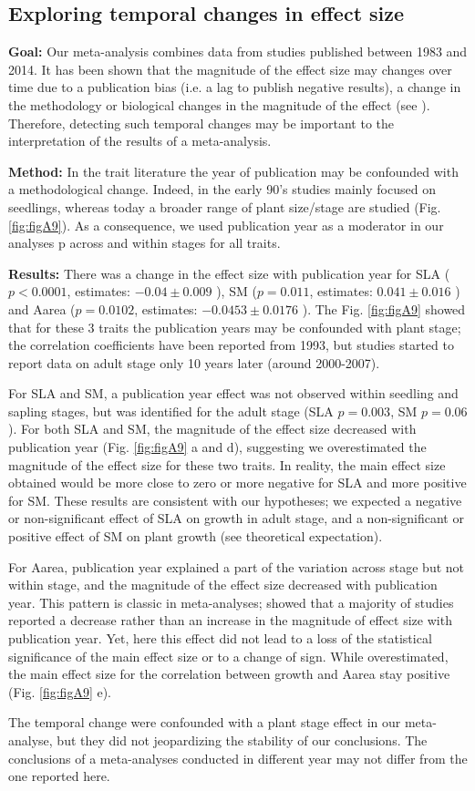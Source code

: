 \documentclass[a4paper,11pt]{article}
\begin{document}
\begin{appendices}
\subsection{Exploring temporal changes in effect size}
\textbf{Goal:} Our meta-analysis combines data from studies published between 1983 and 2014. It has been shown that the magnitude of the effect size may changes over time due to a publication bias (i.e. a lag to publish negative results), a change in the methodology or biological changes in the magnitude of the effect (see \citealt{Koricheva:2013hy}). Therefore, detecting such temporal changes may be important to the interpretation of the results of a meta-analysis.

\textbf{Method:} In the trait literature the year of publication may be confounded with a methodological change. Indeed, in the early 90’s studies mainly focused on seedlings, whereas today a broader range of plant size/stage are studied (Fig. \ref{fig:figA9}). As a consequence, we used publication year as a moderator in our analyses \citep{Zvereva:2008jm}p across and within stages for all traits.

\textbf{Results:} There was a change in the effect size with publication year for SLA ($p<0.0001$, estimates: $-0.04 \pm 0.009$ ), SM ($p = 0.011$, estimates: $0.041 \pm 0.016$ ) and Aarea ($p = 0.0102$, estimates: $-0.0453 \pm 0.0176$ ). The Fig. \ref{fig:figA9} showed that for these 3 traits the publication years may be confounded with plant stage; the correlation coefficients have been reported from 1993, but studies started to report data on adult stage only 10 years later (around 2000-2007).

For SLA and SM, a publication year effect was not observed within seedling and sapling stages, but was identified for the adult stage (SLA $p = 0.003$, SM $p = 0.06$). For both SLA and SM, the magnitude of the effect size decreased with publication year (Fig. \ref{fig:figA9} a and d), suggesting we overestimated the magnitude of the effect size for these two traits.  In reality, the main effect size obtained would be more close to zero or more negative for SLA and more positive for SM. These results are consistent with our hypotheses; we expected a negative or non-significant effect of SLA on growth in adult stage, and a non-significant or positive effect of SM on plant growth (see theoretical expectation).

For Aarea, publication year explained a part of the variation across stage but not within stage, and the magnitude of the effect size decreased with publication year. This pattern is classic in meta-analyses; \citealt{Koricheva:2013hy} showed that a majority of studies reported a decrease rather than an increase in the magnitude of effect size with publication year.  Yet, here this effect did not lead to a loss of the statistical significance of the main effect size or to a change of sign. While overestimated, the main effect size for the correlation between growth and Aarea stay positive  (Fig. \ref{fig:figA9} e).

The temporal change were confounded with a plant stage effect in our meta-analyse, but they did not jeopardizing the stability of our conclusions. The conclusions of a meta-analyses conducted in different year may not differ from the one reported here.


\end{appendices}
\end{document}
